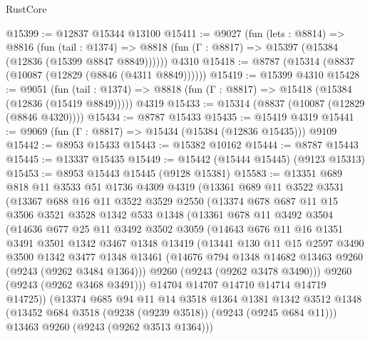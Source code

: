 \begin{lexlean}{RustCore}
\begin{coremodule}
@15399 := @12837 @15344 @13100
@15411 := @9027
    (fun (lets : @8814) =>
    @8816
      (fun (tail : @1374) =>
      @8818 (fun (Γ : @8817) => @15397 (@15384 (@12836 (@15399 @8847 @8849))))))
    @4310
@15418 := @8787 (@15314 (@8837 (@10087 (@12829 (@8846 (@4311 @8849))))))
@15419 := @15399 @4310
@15428 := @9051
    (fun (tail : @1374) => @8818 (fun (Γ : @8817) => @15418 (@15384 (@12836 (@15419 @8849)))))
    @4319
@15433 := @15314 (@8837 (@10087 (@12829 (@8846 @4320))))
@15434 := @8787 @15433
@15435 := @15419 @4319
@15441 := @9069 (fun (Γ : @8817) => @15434 (@15384 (@12836 @15435))) @9109
@15442 := @8953 @15433
@15443 := @15382 @10162
@15444 := @8787 @15443
@15445 := @13337 @15435
@15449 := @15442 (@15444 @15445) (@9123 @15313)
@15453 := @8953 @15443 @15445 (@9128 @15381)
@15583 := @13351
    @689
    @818
    @11
    @3533
    @51
    @1736
    @4309
    @4319
    (@13361
      @689
      @11
      @3522
      @3531
      (@13367
        @688
        @16
        @11
        @3522
        @3529
        @2550
        (@13374
          @678
          @687
          @11
          @15
          @3506
          @3521
          @3528
          @1342
          @533
          @1348
          (@13361
            @678
            @11
            @3492
            @3504
            (@14636
              @677
              @25
              @11
              @3492
              @3502
              @3059
              (@14643
                @676
                @11
                @16
                @1351
                @3491
                @3501
                @1342
                @3467
                @1348
                @13419
                (@13441
                  @130
                  @11
                  @15
                  @2597
                  @3490
                  @3500
                  @1342
                  @3477
                  @1348
                  @13461
                  (@14676 @794 @1348 @14682 @13463 @9260 (@9243 (@9262 @3484 @1364)))
                  @9260
                  (@9243 (@9262 @3478 @3490)))
                @9260
                (@9243 (@9262 @3468 @3491)))
              @14704
              @14707
              @14710
              @14714
              @14719
              @14725))
          (@13374
            @685
            @94
            @11
            @14
            @3518
            @1364
            @1381
            @1342
            @3512
            @1348
            (@13452 @684 @3518 (@9238 (@9239 @3518)) (@9243 (@9245 @684 @11)))
            @13463
            @9260
            (@9243 (@9262 @3513 @1364)))

\end{coremodule}
\end{lexlean}
